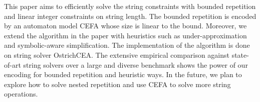 \documentclass{standalone}
\begin{document}
This paper aims to efficiently solve the string constraints with bounded repetition and linear integer constraints on string length. The bounded repetition is encoded by an automaton model CEFA whose size is linear to the bound. Moreover, we extend the algorithm in the paper \cite{atva2020} with heuristics such as under-approximation and symbolic-aware simplification. The implementation of the algorithm is done on string solver OstrichCEA. The extensive empirical comparison against state-of-art string solvers over a large and diverse benchmark shows the power of our encoding for bounded repetition and heuristic ways. In the future, we plan to explore how to solve nested repetition and use CEFA to solve more string operations.
\end{document}
